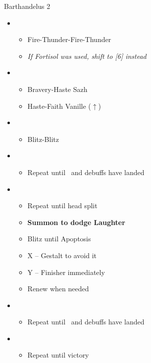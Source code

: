 \begin{battle}{Barthandelus 2}
	\begin{itemize}
		\item \fifth
			\begin{itemize}
				\item Fire-Thunder-Fire-Thunder
				\item \textit{If Fortisol was used, shift to [6] instead}
			\end{itemize}
		\item \first
			\begin{itemize}
				\item Bravery-Haste Sazh
				\item Haste-Faith Vanille ($\uparrow$)
			\end{itemize}	
		\item \sixth
			\begin{itemize}
				\item Blitz-Blitz
			\end{itemize}	
		\item \fifth
			\begin{itemize}
				\item Repeat until \stagger~and debuffs have landed
			\end{itemize}	
		\item \second
			\begin{itemize}
				\item Repeat until head split
				\item \textbf{Summon to dodge Laughter}
				\item Blitz until Apoptosis
				\item X -- Gestalt to avoid it
				\item Y -- Finisher immediately
				\item Renew when needed
			\end{itemize}	
		\item \fifth
			\begin{itemize}
				\item Repeat until \stagger~and debuffs have landed
			\end{itemize}	
		\item \sixth
			\begin{itemize}
				\item Repeat until victory
			\end{itemize}																
	\end{itemize}
\end{battle}
\newpage
